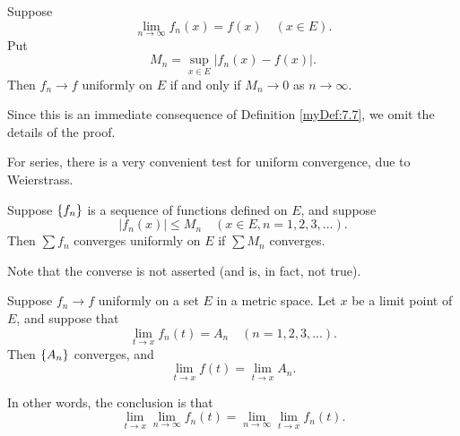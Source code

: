 \begin{thm}
    \label{thm:7.9}
    Suppose 
    \begin{equation*}
        \lim_{n \to \infty} f_n (x) = f(x)
        \quad 
        (x \in E).
    \end{equation*}
    Put 
    \begin{equation*}
        M_n = \sup_{x \in E} \left| f_n (x) - f(x) \right| .
    \end{equation*}
    Then $f_n \rightarrow f$ uniformly on $E$ if and only if $M_n \rightarrow 0$ as $n \rightarrow \infty$.
\end{thm}

Since this is an immediate consequence of Definition \ref{myDef:7.7}, 
we omit the details of the proof.

For series, there is a very convenient test for uniform convergence, due to
Weierstrass.

\begin{thm}
    \label{thm:7.10}
    Suppose $\protect\{f_n\}$ is a sequence of functions defined on $E$, 
    and suppose
    \begin{equation*}
        \left| f_n (x) \right| \leq M_n
        \quad 
        (x \in E, n = 1, 2, 3, ... ).
    \end{equation*}
    Then $\sum f_n$ converges uniformly on $E$ if $\sum M_n$ converges.
\end{thm}

Note that the converse is not asserted (and is, in fact, not true).

\begin{thm}
    \label{thm:7.11}
    Suppose $f_n \rightarrow f$ uniformly on a set $E$ in a metric space. 
    Let $x$ be a limit point of $E$, and suppose that
    \begin{equation}
        \label{eq:7.15}
        \lim_{t \to x} f_n (t) = A_n
        \quad
        (n = 1, 2, 3, ... ).
    \end{equation}
    Then $\protect\{A_n\}$ converges, and
    \begin{equation}
        \label{eq:7.16}
        \lim_{t \to x} f(t) = \lim_{t \to x} A_n.
    \end{equation}

    In other words, the conclusion is that
    \begin{equation}
        \label{eq:7.17}
        \lim_{t \to x} \lim_{n \to \infty} f_n (t) = 
        \lim_{n \to \infty} \lim_{t \to x} f_n (t).
    \end{equation}
\end{thm}

